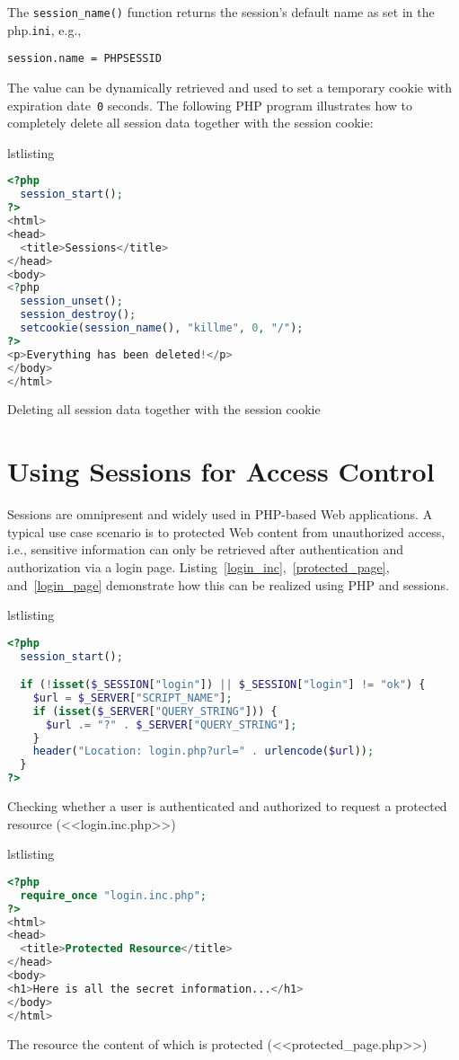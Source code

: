 \documentclass[a4paper, justified, notoc]{tufte-handout} %
\makeatletter
\newenvironment{listing}[1][htbp]
  {\ifvmode\else\unskip\fi\begin{@tufte@float}[#1]{lstlisting}{}}
  {\end{@tufte@float} } %
\makeatother
\begin{document}
The \texttt{session\_name()} function returns the session's default name as set in the php.\texttt{ini}, e.g., 
\begin{Verbatim}
session.name = PHPSESSID
\end{Verbatim}
The value can be dynamically retrieved and used to set a temporary cookie with expiration date~\texttt{0} seconds.
The following PHP program illustrates how to completely delete all session data together with the session cookie:
\begin{listing}
\begin{lstlisting}[language=PHP]
<?php
  session_start();
?>
<html>
<head>
  <title>Sessions</title>
</head>
<body>
<?php
  session_unset();
  session_destroy();
  setcookie(session_name(), "killme", 0, "/");
?>
<p>Everything has been deleted!</p>
</body>
</html>
\end{lstlisting}
	\caption{Deleting all session data together with the session cookie}
	\label{delete_all_session_data}
\end{listing}

\section{Using Sessions for Access Control} %
\label{sec:using_sessions_for_access_control}
Sessions are omnipresent and widely used in PHP-based Web applications.
A typical use case scenario is to protected Web content from unauthorized access, i.e., sensitive information can only be retrieved after authentication and authorization via a login page.
Listing~\ref{login_inc},~\ref{protected_page}, and~\ref{login_page} demonstrate how this can be realized using PHP and sessions.

\begin{listing}
\begin{lstlisting}[language=PHP]
<?php
  session_start();

  if (!isset($_SESSION["login"]) || $_SESSION["login"] != "ok") {
    $url = $_SERVER["SCRIPT_NAME"];
    if (isset($_SERVER["QUERY_STRING"])) {
      $url .= "?" . $_SERVER["QUERY_STRING"];
    }
    header("Location: login.php?url=" . urlencode($url));
  }
?>
\end{lstlisting}
	\caption{Checking whether a user is authenticated and authorized to request a protected resource (<<login.inc.php>>)}
	\label{login_inc}
\end{listing}


\begin{listing}
\begin{lstlisting}[language=PHP]
<?php
  require_once "login.inc.php";
?>
<html>
<head>
  <title>Protected Resource</title>
</head>
<body>
<h1>Here is all the secret information...</h1>
</body>
</html>
\end{lstlisting}
	\caption{The resource the content of which is protected (<<protected\_page.php>>)}
	\label{protected_page}
\end{listing}
\end{document}
